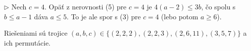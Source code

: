 {\item{$\triangleright$} Nech $c=4$.
Opäť z nerovnosti (5) pre $c=4$ je $4(a-2)\le 3b$, čo spolu s $b\le a-1$ dáva $a\le 5$. To je ale spor s (3) pre $c=4$ (lebo potom $a\ge 6$).

\noindent
Riešeniami sú trojice $(a,b,c)\in\{(2,2,2),(2,2,3),(2,6,11),(3,5,7)\}$ a ich permutácie.
}

